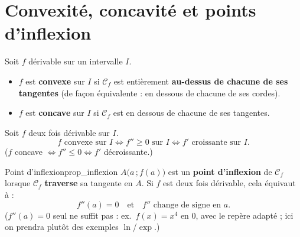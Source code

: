 \section{Convexité, concavité et points d'inflexion}

\begin{definition}
	Soit $f$ dérivable sur un intervalle $I$.
	\begin{itemize}[label=\textbullet]
		\item $f$ est \textbf{convexe} sur $I$ si $\mathcal C_f$ est entièrement
		\textbf{au-dessus de chacune de ses tangentes} (de façon équivalente :
		en dessous de chacune de ses cordes).
		\item $f$ est \textbf{concave} sur $I$ si $\mathcal C_f$ est en dessous de
		chacune de ses tangentes.
	\end{itemize}
\end{definition}

\begin{theoreme}
	Soit $f$ deux fois dérivable sur $I$.
	\[
	f \text{ convexe sur } I
	\iff f'' \geq 0 \text{ sur } I
	\iff f' \text{ croissante sur } I.
	\]
	($f$ concave $\iff f''\leq 0 \iff f'$ décroissante.)
\end{theoreme}

\begin{propriete}{Point d'inflexion}{prop_inflexion}
	$A\bigl(a\,;f(a)\bigr)$ est un \textbf{point d'inflexion} de $\mathcal C_f$
	lorsque $\mathcal C_f$ \textbf{traverse} sa tangente en $A$. Si $f$ est deux
	fois dérivable, cela équivaut à :
	\[
	f''(a)=0 \quad\text{et}\quad f'' \text{ change de signe en } a.
	\]
	($f''(a)=0$ seul ne suffit pas : ex.\ $f(x)=x^{4}$ en $0$, avec le repère
	adapté ; ici on prendra plutôt des exemples $\ln$/$\exp$.)
\end{propriete}

\begin{center}
\end{center}

